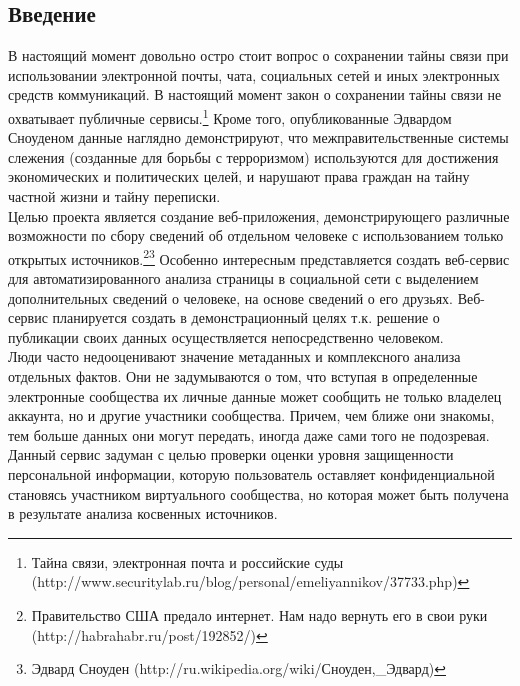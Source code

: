 
\begin{chapter1}
\newpage
\section{Введение}
В настоящий момент довольно остро стоит вопрос о сохранении тайны связи при использовании электронной почты, чата, социальных сетей и иных электронных средств коммуникаций. В настоящий момент  закон о сохранении тайны связи не охватывает публичные сервисы.\footnote{ Тайна связи, электронная почта и российские суды (http://www.securitylab.ru/blog/personal/emeliyannikov/37733.php)}
Кроме того, опубликованные Эдвардом Сноуденом данные наглядно демонстрируют, что межправительственные системы слежения (созданные для борьбы с терроризмом) используются для достижения экономических и политических целей, и нарушают права граждан на тайну частной жизни и тайну переписки.\\

Целью проекта является создание веб-приложения, демонстрирующего различные возможности по сбору сведений об отдельном человеке с использованием только открытых источников.\footnote{Правительство США предало интернет. Нам надо вернуть его в свои руки     (http://habrahabr.ru/post/192852/)}\footnote{Эдвард Сноуден (http://ru.wikipedia.org/wiki/Сноуден,\_Эдвард)} 
Особенно интересным представляется создать веб-сервис для автоматизированного анализа страницы в социальной сети с выделением дополнительных сведений о человеке, на основе сведений о его друзьях. Веб-сервис планируется создать в демонстрационный целях т.к. решение о публикации своих данных осуществляется непосредственно человеком.\\

Люди часто недооценивают значение метаданных и комплексного анализа отдельных фактов. Они не задумываются о том, что вступая в определенные электронные сообщества их личные данные может сообщить не только владелец аккаунта, но и другие участники сообщества. Причем, чем ближе они знакомы, тем больше данных они могут передать, иногда даже сами того не подозревая.\\

Данный сервис задуман с целью проверки оценки уровня защищенности персональной информации, которую пользователь оставляет конфиденциальной становясь участником виртуального сообщества, но которая может быть получена в результате анализа косвенных источников. \\


\end{chapter1}
